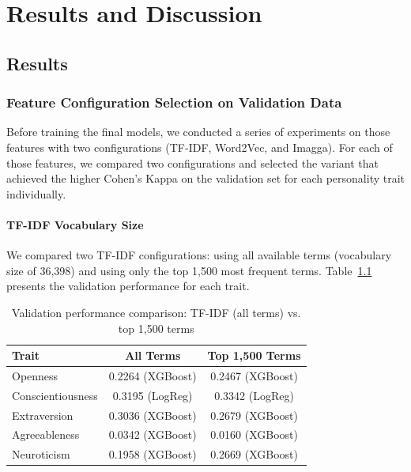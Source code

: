 \chapter{Results and Discussion}
\label{sec:results}

\section{Results}

\subsection{Feature Configuration Selection on Validation Data}
\label{sec:preliminary_analysis}

Before training the final models, we conducted a series of experiments on those features with two configurations (TF-IDF, Word2Vec, and Imagga). For each of those features,  we compared two configurations and selected the variant that achieved the higher Cohen's Kappa on the validation set for each personality trait individually.

\subsubsection{TF-IDF Vocabulary Size}

We compared two TF-IDF configurations: using all available terms (vocabulary size of 36,398) and using only the top 1,500 most frequent terms. Table~\ref{tab:validation_tfidf} presents the validation performance for each trait.

\begin{table}[H]
	\centering
	\caption{Validation performance comparison: TF-IDF (all terms) vs. top 1,500 terms}
	\label{tab:validation_tfidf}
	\begin{tabular}{lcc}
		\hline
		\textbf{Trait} & \textbf{All Terms} & \textbf{Top 1,500 Terms} \\
		\hline
		Openness          & 0.2264 (XGBoost) & 0.2467 (XGBoost) \\
		Conscientiousness & 0.3195 (LogReg)  & 0.3342 (LogReg)  \\
		Extraversion      & 0.3036 (XGBoost) & 0.2679 (XGBoost) \\
		Agreeableness     & 0.0342 (XGBoost) & 0.0160 (XGBoost) \\
		Neuroticism       & 0.1958 (XGBoost) & 0.2669 (XGBoost) \\
		\hline
	\end{tabular}
\end{table}

